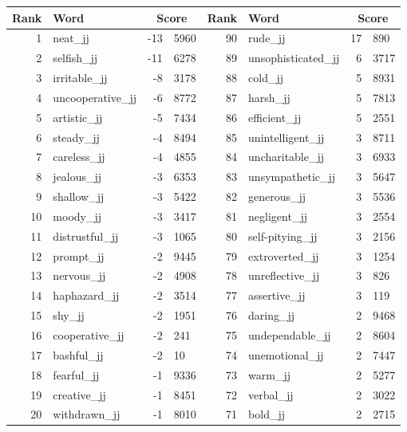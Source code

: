 \begin{table}[tbp]
    \begin{tabular}{| rlr@{.}l | rlr@{.}l |}
    \hline
    \textbf{Rank} & \textbf{Word} & \multicolumn{2}{c|}{\textbf{Score}} & \textbf{Rank} & \textbf{Word} & \multicolumn{2}{c|}{\textbf{Score}} \\
    \hline
    1 & neat\_jj & -13 & 5960    &    90 & rude\_jj & 17 & 890 \\
    2 & selfish\_jj & -11 & 6278    &    89 & unsophisticated\_jj & 6 & 3717 \\
    3 & irritable\_jj & -8 & 3178    &    88 & cold\_jj & 5 & 8931 \\
    4 & uncooperative\_jj & -6 & 8772    &    87 & harsh\_jj & 5 & 7813 \\
    5 & artistic\_jj & -5 & 7434    &    86 & efficient\_jj & 5 & 2551 \\
    6 & steady\_jj & -4 & 8494    &    85 & unintelligent\_jj & 3 & 8711 \\
    7 & careless\_jj & -4 & 4855    &    84 & uncharitable\_jj & 3 & 6933 \\
    8 & jealous\_jj & -3 & 6353    &    83 & unsympathetic\_jj & 3 & 5647 \\
    9 & shallow\_jj & -3 & 5422    &    82 & generous\_jj & 3 & 5536 \\
    10 & moody\_jj & -3 & 3417    &    81 & negligent\_jj & 3 & 2554 \\
    11 & distrustful\_jj & -3 & 1065    &    80 & self-pitying\_jj & 3 & 2156 \\
    12 & prompt\_jj & -2 & 9445    &    79 & extroverted\_jj & 3 & 1254 \\
    13 & nervous\_jj & -2 & 4908    &    78 & unreflective\_jj & 3 & 826 \\
    14 & haphazard\_jj & -2 & 3514    &    77 & assertive\_jj & 3 & 119 \\
    15 & shy\_jj & -2 & 1951    &    76 & daring\_jj & 2 & 9468 \\
    16 & cooperative\_jj & -2 & 241    &    75 & undependable\_jj & 2 & 8604 \\
    17 & bashful\_jj & -2 & 10    &    74 & unemotional\_jj & 2 & 7447 \\
    18 & fearful\_jj & -1 & 9336    &    73 & warm\_jj & 2 & 5277 \\
    19 & creative\_jj & -1 & 8451    &    72 & verbal\_jj & 2 & 3022 \\
    20 & withdrawn\_jj & -1 & 8010    &    71 & bold\_jj & 2 & 2715 \\

\end{tabular}
\end{table}
